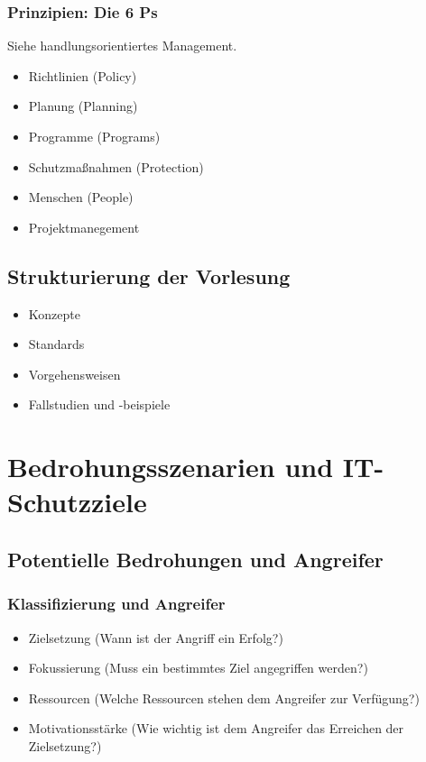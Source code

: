 \subsubsection{Prinzipien: Die 6 Ps}
Siehe handlungsorientiertes Management.
\begin{itemize}
	\item Richtlinien (Policy)
	\item Planung (Planning)
	\item Programme (Programs)
	\item Schutzmaßnahmen (Protection)
	\item Menschen (People)
	\item Projektmanegement
\end{itemize}

\subsection{Strukturierung der Vorlesung}
\begin{itemize}
	\item Konzepte
	\item Standards
	\item Vorgehensweisen
	\item Fallstudien und -beispiele
\end{itemize}



\section{Bedrohungsszenarien und IT-Schutzziele}

\subsection{Potentielle Bedrohungen und Angreifer}

\subsubsection{Klassifizierung und Angreifer}
\begin{itemize}
	\item Zielsetzung (Wann ist der Angriff ein Erfolg?)
	\item Fokussierung (Muss ein bestimmtes Ziel angegriffen werden?)
	\item Ressourcen (Welche Ressourcen stehen dem Angreifer zur Verfügung?)
	\item Motivationsstärke (Wie wichtig ist dem Angreifer das Erreichen der Zielsetzung?)
\end{itemize}

